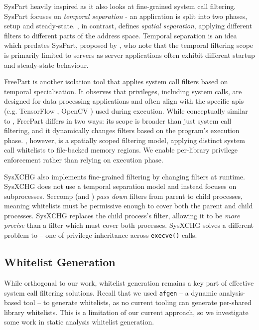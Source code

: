SysPart \cite{SYSPART} heavily inspired \af as it also
looks at fine-grained system call filtering. SysPart focuses on \textit{temporal
separation} - an application is split into two phases, setup and steady-state.
\af, in contrast, defines \textit {spatial separation}, applying different
filters to different parts of the address space. Temporal separation is an
idea which predates SysPart, proposed by \textcite{TEMPORAL_SPEC}, who note that
the temporal filtering scope is primarily limited to servers as server
applications often exhibit different startup and steady-state behaviour. 

FreePart \cite{ahad2023freepart} is another isolation tool that applies
system call filters based on temporal specialisation. It observes that privileges, including system calls, are designed for data processing applications
and often align with the specific \acp{api} (e.g. TensorFlow
\cite{tensorflow2015}, OpenCV \cite{opencv_library}) used during execution. While
conceptually similar to \af, FreePart differs in two ways: its scope is broader
than just system call filtering, and it dynamically changes filters based on
the program's execution phase. \af, however, is a spatially scoped filtering
model, applying distinct system call whitelists to file-backed memory regions.
We enable per-library privilege enforcement rather than relying on execution 
phase.

SysXCHG \cite{SYSXCHG} also implements fine-grained filtering by changing
filters at runtime. SysXCHG does not use a temporal separation model and instead
focuses on subprocesses. Seccomp (and \af) \textit{pass down} filters from
parent to child processes, meaning whitelists must be permissive enough
to cover both the parent and child processes. SysXCHG replaces the child
process's filter, allowing it to be \textit{more precise} than a filter which
must cover both processes. SysXCHG solves a different problem to \af -- one of
privilege inheritance across \texttt{execve()} calls.

\subsection{Whitelist Generation}

While orthogonal to our work, whitelist generation remains a key part of
effective system call filtering solutions. Recall that we used \texttt{afgen} --
a dynamic analysis-based tool -- to generate \af whitelists, as no current
tooling can generate per-shared library whitelists. This is a limitation
of our current approach, so we investigate some work in static analysis
whitelist generation.

